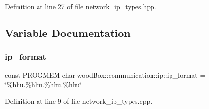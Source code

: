 Definition at line 27 of file network\+\_\+ip\+\_\+types.\+hpp.



\subsection{Variable Documentation}
\mbox{\label{namespacewood_box_1_1communication_1_1ip_a6b47ca4e737d6bca23c7ec31d3ab3402}} 
\subsubsection{\texorpdfstring{ip\+\_\+format}{ip\_format}}
{\footnotesize\ttfamily const P\+R\+O\+G\+M\+EM char wood\+Box\+::communication\+::ip\+::ip\+\_\+format = \char`\"{}\%hhu.\%hhu.\%hhu.\%hhu\char`\"{}}



Definition at line 9 of file network\+\_\+ip\+\_\+types.\+cpp.

